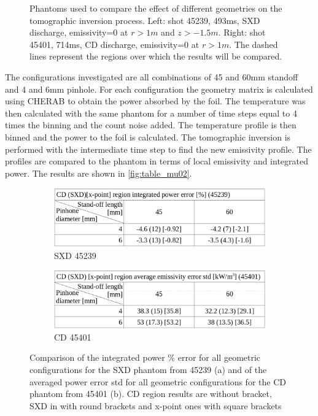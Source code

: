\begin{figure}
    \caption{Phantoms used to compare the effect of different geometries on the tomographic inversion process. Left: shot 45239, 493ms, SXD discharge, emissivity=0 at $r>1m$ and $z>-1.5m$. Right:  shot 45401, 714ms, CD discharge, emissivity=0 at $r>1m$. The dashed lines represent the regions over which the results will be compared.}
    \label{fig:phantoms}
\end{figure}

The configurations investigated are all combinations of 45 and 60mm standoff and 4 and 6mm pinhole. 
For each configuration the geometry matrix is calculated using CHERAB to obtain the power absorbed by the foil. The temperature was then calculated with the same phantom for a number of time steps equal to 4 times the binning and the count noise added. The temperature profile is then binned and the power to the foil is calculated. The tomographic inversion is performed with the intermediate time step to find the new emissivity profile. The profiles are compared to the phantom in terms of local emissivity and integrated power. The results are shown in \autoref{fig:table_mu02}.

\begin{figure}
     \centering
     \begin{subfigure}{0.45\textwidth}
         \centering
         \includegraphics[width=\textwidth]{Chapters/appendix1/figs/table45239.png}
         \caption{SXD 45239}
         \label{fig:table45239}
     \end{subfigure}
     \hfill
     \begin{subfigure}{0.45\textwidth}
         \centering
         \includegraphics[width=\textwidth]{Chapters/appendix1/figs/table45401.png}
         \caption{CD 45401}
         \label{fig:table45401}
     \end{subfigure}

    \caption{Comparison of the integrated power $\%$ error for all geometric configurations for the SXD phantom from 45239 (a) and of the averaged power error std for all geometric configurations for the CD phantom from 45401 (b). CD region results are without bracket, SXD in with round brackets and x-point ones with square brackets}
    \label{fig:table_mu02}
\end{figure}


